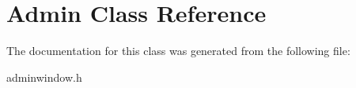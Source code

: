 \hypertarget{class_admin}{}\section{Admin Class Reference}
\label{class_admin}


The documentation for this class was generated from the following file\+:\begin{DoxyCompactItemize}
\item 
adminwindow.\+h\end{DoxyCompactItemize}
